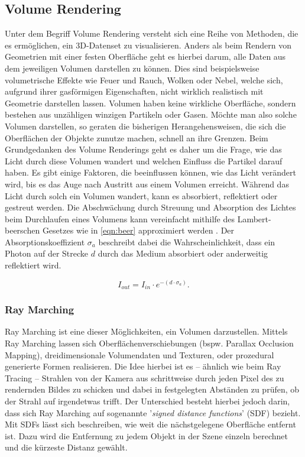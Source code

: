 \subsection{Volume Rendering}

Unter dem Begriff Volume Rendering versteht sich eine Reihe von Methoden, die es ermöglichen, ein 3D-Datenset zu visualisieren.
Anders als beim Rendern von Geometrien mit einer festen Oberfläche geht es hierbei darum, alle Daten aus
dem jeweiligen Volumen darstellen zu können. Dies sind beispielsweise volumetrische Effekte wie Feuer und Rauch, Wolken oder Nebel,
welche sich, aufgrund ihrer gasförmigen Eigenschaften, nicht wirklich realistisch mit Geometrie darstellen lassen.
Volumen haben keine wirkliche Oberfläche, sondern bestehen aus unzähligen winzigen Partikeln oder Gasen.
Möchte man also solche Volumen darstellen, so geraten die bisherigen Herangehensweisen, die sich die Oberflächen der Objekte zunutze machen,
schnell an ihre Grenzen. Beim Grundgedanken des Volume Renderings geht es daher um die Frage, wie das Licht durch diese Volumen
wandert und welchen Einfluss die Partikel darauf haben.
Es gibt einige Faktoren, die beeinflussen können, wie das Licht verändert wird, bis es das Auge nach Austritt aus einem Volumen erreicht.
Während das Licht durch solch ein Volumen wandert, kann es absorbiert, reflektiert oder gestreut werden.
Die Abschwächung durch Streuung und Absorption des Lichtes beim Durchlaufen eines Volumens kann vereinfacht mithilfe des Lambert-beerschen Gesetzes wie in \autoref{eqn:beer}
approximiert werden \parencite{Mayerhofer2020}.
Der Absorptionskoeffizient $\sigma_a$ beschreibt dabei die Wahrscheinlichkeit, dass ein Photon auf der Strecke $d$ durch das Medium absorbiert oder anderweitig
reflektiert wird.

\vspace{-0.5cm  }
\begin{equation}
	\label{eqn:beer}
	I_{out} = I_{in} \cdot e^{- ( d \cdot\sigma_a  )}.
\end{equation}





\subsubsection{Ray Marching}

Ray Marching ist eine dieser Möglichkeiten, ein Volumen darzustellen. Mittels Ray Marching lassen sich Oberflächenverschiebungen (bspw. Parallax Occlusion Mapping),
dreidimensionale Volumendaten und Texturen, oder prozedural generierte Formen realisieren. Die Idee hierbei ist es – ähnlich wie beim Ray Tracing –
Strahlen von der Kamera aus schrittweise durch jeden Pixel des zu rendernden Bildes zu schicken und dabei in festgelegten Abständen zu prüfen,
ob der Strahl auf irgendetwas trifft.
Der Unterschied besteht hierbei jedoch darin, dass sich Ray Marching auf sogenannte '\textit{signed distance functions}' (SDF) bezieht.
Mit SDFs lässt sich beschreiben, wie weit die nächstgelegene Oberfläche entfernt ist. Dazu wird die Entfernung zu jedem Objekt
in der Szene einzeln berechnet und die kürzeste Distanz gewählt.

